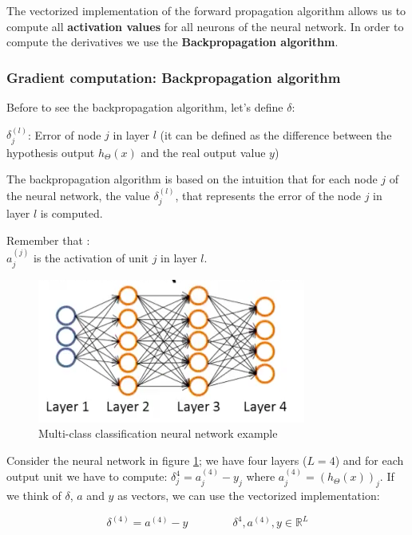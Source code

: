 The vectorized implementation of the forward propagation algorithm allows us to compute all  {\bf activation values} for all neurons of the neural network. In order to compute the derivatives we use the {\bf Backpropagation algorithm}. 


\subsubsection{Gradient computation: Backpropagation algorithm}
Before to see the backpropagation algorithm, let's define  $\delta$:\\
\begin{mydef}
$\delta_j^{(l)}$: Error of node $j$ in layer $l$ (it can be defined as the difference between the hypothesis output $h_\Theta(x)$ and the real output value $y$)
\end{mydef}

The backpropagation algorithm is based on the intuition that for each node $j$ of the neural network, the value $\delta_j^{(l)}$, that represents the error of the node $j$ in layer $l$ is computed.

Remember that :\\
$a_j^{(j)}$ is the activation of unit $j$ in layer $l$.


\begin{figure}[H]
\begin{center}
\includegraphics[scale=0.35]{images/learn-nn}
\end{center}
\caption{Multi-class classification neural network example } 
\label{fig:learn-nn1}
\end{figure}

Consider the neural network in figure \ref{fig:learn-nn1}; we have four layers ($L=4$) and for each output unit we have to compute: $\delta_j^{4} = a_j^{(4)} - y_j$ where $a_j^{(4)} = (h_\Theta(x))_j$. If we think of $\delta$, $a$ and $y$ as vectors, we can use the vectorized implementation:

\begin{eqfloat}[H]
\begin{equation}
\delta^{(4)} = a^{(4)} - y 	\qquad \qquad 	\delta^{4}, a^{(4)}, y \in \mathbb{R}^L 
\end{equation}
      \addtocounter{equation}{-1}
        \caption{ Error computation with vectorized implementation}
        \label{eq:errvect}
    \end{eqfloat}

